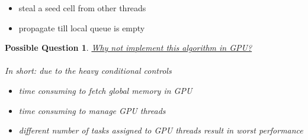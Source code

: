 \documentclass[8pt]{beamer}
\newtheorem{question}{Possible Question}
\begin{document}
\begin{frame}
\begin{columns}
\begin{column}{.5\textwidth}
\begin{itemize}
      \item steal a seed cell from other threads
      \item propagate till local queue is empty
      \end{itemize}
      \begin{question}
        \underline{Why not implement this algorithm in GPU?}\\
        \\
        In short: due to the heavy conditional controls
        \begin{itemize}
        \item time consuming to fetch global memory in GPU
        \item time consuming to manage GPU threads
        \item different number of tasks assigned to GPU threads result in worst performance
        \end{itemize}
      \end{question}
    \end{column}
  \end{columns}
\end{frame}
\note{}
\end{document}
